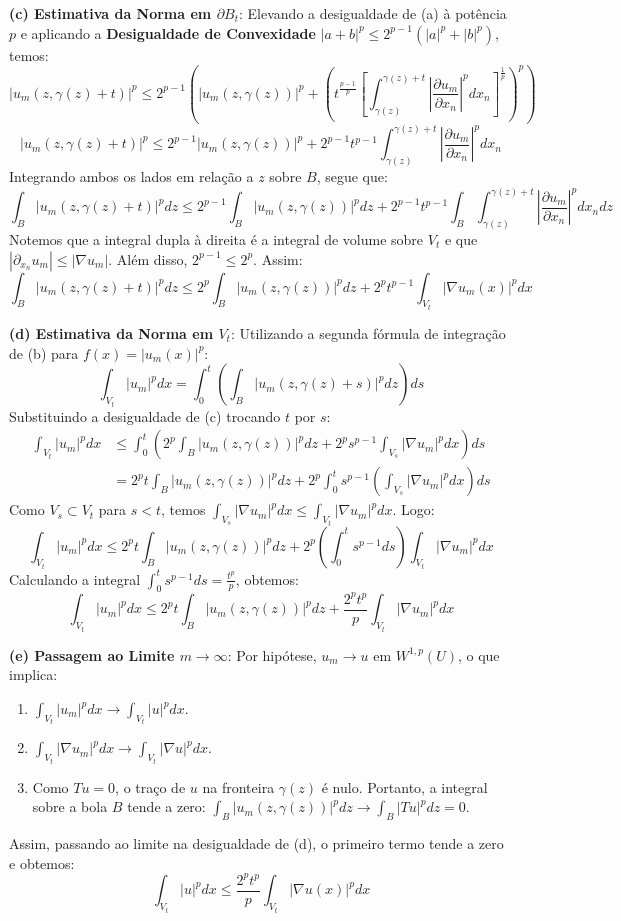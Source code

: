 \documentclass[cs_edp_2026.1.tex]{subfiles} %
\begin{document}
{	\textbf{(c) Estimativa da Norma em $\partial B_t$}:
	Elevando a desigualdade de (a) à potência $p$ e aplicando a \textbf{Desigualdade de Convexidade} $|a+b|^p \le 2^{p-1}(|a|^p + |b|^p)$, temos:
	$$|u_m(z, \gamma(z) + t)|^p \le 2^{p-1} \left( |u_m(z, \gamma(z))|^p + \left( t^{\frac{p-1}{p}} \left[ \int_{\gamma(z)}^{\gamma(z)+t} \left| \frac{\partial u_m}{\partial x_n} \right|^p dx_n \right]^{\frac{1}{p}} \right)^p \right)$$
	$$|u_m(z, \gamma(z) + t)|^p \le 2^{p-1} |u_m(z, \gamma(z))|^p + 2^{p-1} t^{p-1} \int_{\gamma(z)}^{\gamma(z)+t} \left| \frac{\partial u_m}{\partial x_n} \right|^p dx_n$$
	Integrando ambos os lados em relação a $z$ sobre $B$, segue que:
	$$\int_B |u_m(z, \gamma(z) + t)|^p dz \le 2^{p-1} \int_B |u_m(z, \gamma(z))|^p dz + 2^{p-1} t^{p-1} \int_B \int_{\gamma(z)}^{\gamma(z)+t} \left| \frac{\partial u_m}{\partial x_n} \right|^p dx_n dz$$
	Notemos que a integral dupla à direita é a integral de volume sobre $V_t$ e que $|\partial_{x_n} u_m| \le |\nabla u_m|$. Além disso, $2^{p-1} \le 2^p$. Assim:
	$$\boxed{\int_B |u_m(z, \gamma(z) + t)|^p dz \le 2^p \int_B |u_m(z, \gamma(z))|^p dz + 2^p t^{p-1} \int_{V_t} |\nabla u_m(x)|^p dx}$$
	
	\textbf{(d) Estimativa da Norma em $V_t$}:
	Utilizando a segunda fórmula de integração de (b) para $f(x) = |u_m(x)|^p$:
	$$\int_{V_t} |u_m|^p dx = \int_0^t \left( \int_B |u_m(z, \gamma(z) + s)|^p dz \right) ds$$
	Substituindo a desigualdade de (c) trocando $t$ por $s$:
	\begin{align*}
		\int_{V_t} |u_m|^p dx &\le \int_0^t \left( 2^p \int_B |u_m(z, \gamma(z))|^p dz + 2^p s^{p-1} \int_{V_s} |\nabla u_m|^p dx \right) ds \\
		&= 2^p t \int_B |u_m(z, \gamma(z))|^p dz + 2^p \int_0^t s^{p-1} \left( \int_{V_s} |\nabla u_m|^p dx \right) ds
	\end{align*}
	Como $V_s \subset V_t$ para $s < t$, temos $\int_{V_s} |\nabla u_m|^p dx \le \int_{V_t} |\nabla u_m|^p dx$. Logo:
	$$\int_{V_t} |u_m|^p dx \le 2^p t \int_B |u_m(z, \gamma(z))|^p dz + 2^p \left( \int_0^t s^{p-1} ds \right) \int_{V_t} |\nabla u_m|^p dx$$
	Calculando a integral $\int_0^t s^{p-1} ds = \tfrac{t^p}{p}$, obtemos:
	$$\boxed{\int_{V_t} |u_m|^p dx \le 2^p t \int_B |u_m(z, \gamma(z))|^p dz + \frac{2^p t^p}{p} \int_{V_t} |\nabla u_m|^p dx}$$
	
	\textbf{(e) Passagem ao Limite $m \to \infty$}:
	Por hipótese, $u_m \to u$ em $W^{1,p}(U)$, o que implica:
	\begin{enumerate}[label=(\roman*)]
		\item $\int_{V_t} |u_m|^p dx \to \int_{V_t} |u|^p dx$.
		\item $\int_{V_t} |\nabla u_m|^p dx \to \int_{V_t} |\nabla u|^p dx$.
		\item Como $Tu = 0$, o traço de $u$ na fronteira $\gamma(z)$ é nulo. Portanto, a integral sobre a bola $B$ tende a zero: $\int_B |u_m(z, \gamma(z))|^p dz \to \int_B |Tu|^p dz = 0$.
	\end{enumerate}
	Assim, passando ao limite na desigualdade de (d), o primeiro termo tende a zero e obtemos:
	$$\boxed{\int_{V_t} |u|^p dx \le \frac{2^p t^p}{p} \int_{V_t} |\nabla u(x)|^p dx}$$
}
\end{document}
